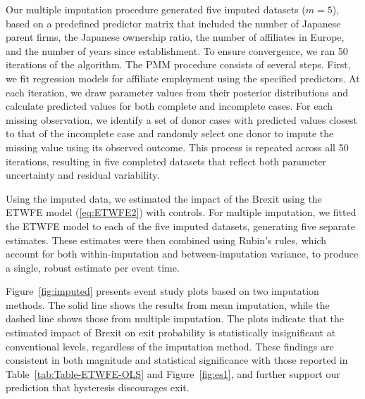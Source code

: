 \documentclass[preprint,11pt,authoryear]{elsarticle}
\begin{document}
Our multiple imputation procedure generated five imputed datasets ($m=5$), based on a predefined predictor matrix that included the number of Japanese parent firms, the Japanese ownership ratio, the number of affiliates in Europe, and the number of years since establishment. To ensure convergence, we ran 50 iterations of the algorithm.
The PMM procedure consists of several steps. First, we fit regression models for affiliate employment using the specified predictors. At each iteration, we draw parameter values from their posterior distributions and calculate predicted values for both complete and incomplete cases.  
For each missing observation, we identify a set of donor cases with predicted values closest to that of the incomplete case and randomly select one donor to impute the missing value using its observed outcome.  
This process is repeated across all 50 iterations, resulting in five completed datasets that reflect both parameter uncertainty and residual variability.  


Using the imputed data, we estimated the impact of the Brexit using the ETWFE model (\ref{eq:ETWFE2}) with controls.
For multiple imputation, we fitted the ETWFE model to each of the five imputed datasets, generating five separate estimates. These estimates were then combined using Rubin’s rules, which account for both within-imputation and between-imputation variance, to produce a single, robust estimate per event time.



Figure~\ref{fig:imputed} presents event study plots based on two imputation methods. The solid line shows the results from mean imputation, while the dashed line shows those from multiple imputation. The plots indicate that the estimated impact of Brexit on exit probability is statistically insignificant at conventional levels, regardless of the imputation method. These findings are consistent in both magnitude and statistical significance with those reported in Table~\ref{tab:Table-ETWFE-OLS} and Figure~\ref{fig:es1}, and further support our prediction that hysteresis discourages exit.
\end{document}
